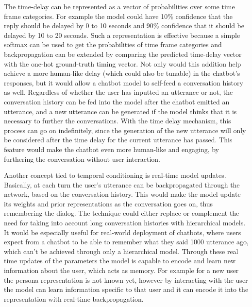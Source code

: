\documentclass[12pt]{article}
\begin{document}
The time-delay can be represented as a vector of probabilities over some time frame categories. For example the model could have 10\% confidence that the reply should be delayed by 0 to 10 seconds and 90\% confidence that it should be delayed by 10 to 20 seconds. Such a representation is effective because a simple softmax can be used to get the probabilities of time frame categories and backpropagation can be extended by comparing the predicted time-delay vector with the one-hot ground-truth timing vector. Not only would this addition help achieve a more human-like delay (which could also be tunable) in the chatbot's responses, but it would allow a chatbot model to self-feed a conversation history as well. Regardless of whether the user has inputted an utterance or not, the conversation history can be fed into the model after the chatbot emitted an utterance, and a new utterance can be generated if the model thinks that it is necessary to further the conversations. With the time delay mechanism, this process can go on indefinitely, since the generation of the new utterance will only be considered after the time delay for the current utterance has passed. This feature would make the chatbot even more human-like and engaging, by furthering the conversation without user interaction.

Another concept tied to temporal conditioning is real-time model updates. Basically, at each turn the user's utterance can be backpropagated through the network, based on the conversation history. This would make the model update its weights and prior representations as the conversation goes on, thus remembering the dialog. The technique could either replace or complement the need for taking into account long conversation histories with hierarchical models. It would be especially useful for real-world deployment of chatbots, where users expect from a chatbot to be able to remember what they said 1000 utterance ago, which can't be achieved through only a hierarchical model. Through these real time updates of the parameters the model is capable to encode and learn new information about the user, which acts as memory. For example for a new user the persona representation is not known yet, however by interacting with the user the model can learn information specific to that user and it can encode it into the representation with real-time backpropagation.
\end{document}
